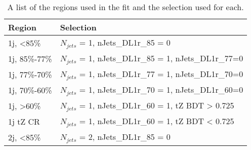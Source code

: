 \begin{table}[h]
\centering
\caption{A list of the regions used in the fit and the selection used for each.}
\begin{tabular}{l|l}
\hline\hline
Region & Selection            \\
\hline
\hline
1j, <85\%       & $N_{jets}$ = 1, nJets\_DL1r\_85 = 0            \\
1j, 85\%-77\%   & $N_{jets}$ = 1, nJets\_DL1r\_85 = 1, nJets\_DL1r\_77=0                     \\
1j, 77\%-70\%   & $N_{jets}$ = 1, nJets\_DL1r\_77 = 1, nJets\_DL1r\_70=0                     \\
1j, 70\%-60\%   & $N_{jets}$ = 1, nJets\_DL1r\_70 = 1, nJets\_DL1r\_60=0                      \\
1j, >60\%       & $N_{jets}$ = 1, nJets\_DL1r\_60 = 1, tZ BDT > 0.725 \\
1j tZ CR        & $N_{jets}$ = 1, nJets\_DL1r\_60 = 1, tZ BDT < 0.725 \\
2j, <85\%       & $N_{jets}$ = 2, nJets\_DL1r\_85 = 0                    \\

\end{tabular}
\end{table}
